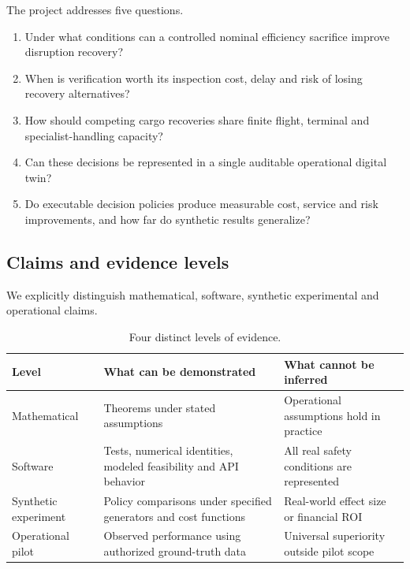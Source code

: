 \documentclass[10pt,a4paper]{article}
\theoremstyle{plain}
\theoremstyle{definition}
\theoremstyle{remark}
\begin{document}
The project addresses five questions.

\begin{enumerate}[
  label=\textbf{RQ\arabic*.},
  leftmargin=20pt,
  itemsep=3pt
]
\item Under what conditions can a controlled nominal
efficiency sacrifice improve disruption recovery?
\item When is verification worth its inspection cost,
delay and risk of losing recovery alternatives?
\item How should competing cargo recoveries share
finite flight, terminal and specialist-handling capacity?
\item Can these decisions be represented in a
single auditable operational digital twin?
\item Do executable decision policies produce
measurable cost, service and risk improvements,
and how far do synthetic results generalize?
\end{enumerate}

\subsection{Claims and evidence levels}

We explicitly distinguish mathematical,
software, synthetic experimental and operational
claims.

\begin{table}[!htbp]
\centering
\caption{Four distinct levels of evidence.}
\label{tab:evidencelevels}
\small
\begin{tabularx}{\linewidth}{@{}p{24mm}L L@{}}
\toprule
\textbf{Level} &
\textbf{What can be demonstrated} &
\textbf{What cannot be inferred} \\
\midrule
Mathematical &
Theorems under stated assumptions &
Operational assumptions hold in practice \\
Software &
Tests, numerical identities,
modeled feasibility and API behavior &
All real safety conditions are represented \\
Synthetic experiment &
Policy comparisons under specified
generators and cost functions &
Real-world effect size or financial ROI \\
Operational pilot &
Observed performance using authorized
ground-truth data &
Universal superiority outside pilot scope \\
\bottomrule
\end{tabularx}
\end{table}
\end{document}
